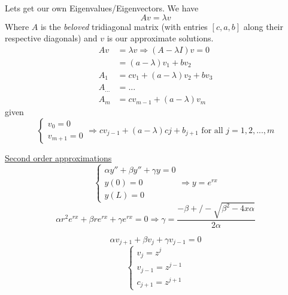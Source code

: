 \documentclass[10pt]{article}
\begin{document}
Lets get our own Eigenvalues/Eigenvectors. We have
\[Av  = \lambda v\]
Where $A$ is the \textit{beloved} tridiagonal matrix (with entries $[c,a,b]$ along their respective diagonals) and $v$ is our approximate solutions.
\begin{align*}
    Av &= \lambda v \Rightarrow (A - \lambda I)v = 0\\
       &= (a - \lambda) v_1 + b v_2\\
   A_1 &= c v_1 + (a - \lambda) v_2 + bv_3\\
   A_{...} &= ...\\
   A_m &= c v_{m-1} + (a - \lambda) v_m
\end{align*}
given
\[
    \begin{cases}
    v_0 = 0\\
    v_{m+1} = 0
\end{cases} \Rightarrow c v_{j-1} + (a - \lambda) cj + b_{j+1} \text{ for all } j=1,2,...,m\]

\underline{Second order approximations}
\[\begin{cases}
\alpha y'' + \beta y'' + \gamma y = 0\\
y(0) = 0\\
y(L) = 0
\end{cases} \Rightarrow y = e^{rx}\]
\[\alpha r^2 e^{rx} + \beta r e^{rx} + \gamma e^{rx} = 0 \Rightarrow \gamma = \frac{- \beta +/- \sqrt{\beta^2 - 4 x \alpha}}{2 \alpha}\]

\[\alpha v_{j+1} + \beta v_j + \gamma v_{j-1} = 0\]
\[\begin{cases}
v_j = z^j\\
v_{j-1} = z^{j-1}\\
c_{j+1} = z^{j+1}
\end{cases}\]

\noindent \underline{\hspace{3in}}\\
\end{document}
